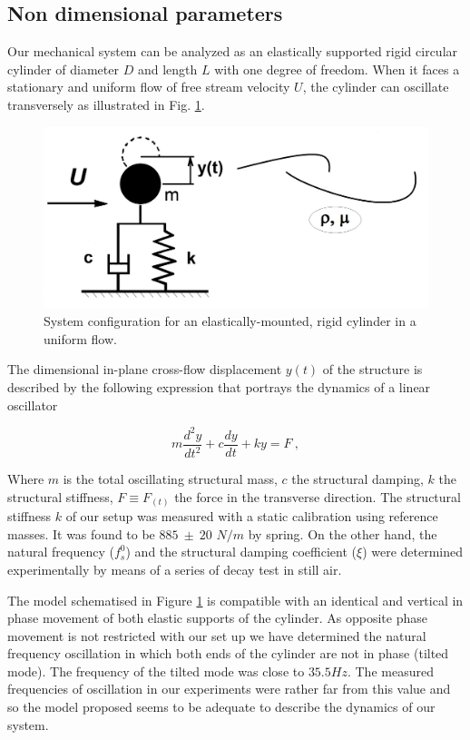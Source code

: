 \documentclass[review]{elsarticle}
\begin{document}
\subsection*{Non dimensional parameters}

Our mechanical system can be analyzed as an  elastically supported rigid circular cylinder of diameter $D$ and length $L$ with one degree of freedom. When it faces a stationary and uniform flow of free stream velocity $U$,  the cylinder can oscillate transversely as illustrated in Fig. \ref{fig:03}.

\begin{figure}[h]
\centering
\includegraphics[width = 0.6 \textwidth]{Figures/Fig_03}
\caption{System configuration for an elastically-mounted, rigid cylinder in a uniform flow.} %
\label{fig:03}
\end{figure}

The dimensional in-plane cross-flow displacement $y(t)$ of the structure is described by the following expression that portrays the dynamics of a linear oscillator

\begin{equation}
m \frac{d^2y}{dt^2} + c \frac{dy}{dt} + k y = F~,
\label{eq:model}
\end{equation}

Where $m$ is the total oscillating structural mass, $c$ the structural damping, $k$ the structural stiffness, $F \equiv F_{(t)}$ the force in the transverse direction. The structural stiffness $k$ of our setup was measured with a static calibration using reference masses. It was found to be $885 ~\pm ~20$ $N/m$ by spring. On the other hand, the natural frequency ($f_{s}^{0}$) and the structural damping coefficient ($\xi$) were determined experimentally by means of a series of decay test in still air.

The model schematised in Figure \ref{fig:03} is compatible with an identical and vertical in phase movement of both elastic supports of the cylinder. As opposite phase movement is not restricted with our set up we have determined the natural frequency oscillation in which both ends of the cylinder are not in phase (tilted mode). The frequency of the tilted mode was close to $35.5 Hz$. The measured frequencies of oscillation in our experiments were rather far from this value and  so the model proposed seems to be adequate to describe the dynamics of our system.
\end{document}
